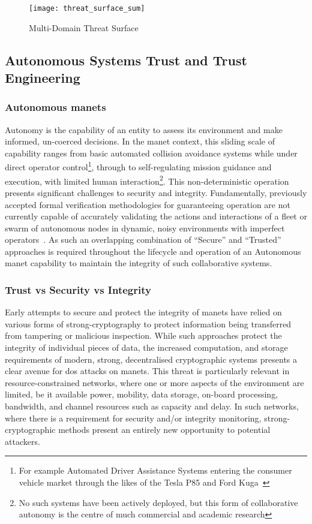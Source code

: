 \begin{figure}[h!]
	\centering
	\texttt{[image: threat\_surface\_sum]}
	\caption[Multi-Domain Threat Surface]{Multi-Domain Threat Surface}
	\label{fig:threat_surface}
\end{figure}


\subsection{Autonomous Systems Trust and Trust Engineering}

\subsubsection{Autonomous \glspl{manet}}
Autonomy is the capability of an entity to assess its environment and make informed, un-coerced decisions.
In the \gls{manet} context, this sliding scale of capability ranges from basic automated collision avoidance systems while under direct operator control\footnote{For example Automated Driver Assistance Systems entering the consumer vehicle market through the likes of the Tesla P85 and Ford Kuga~\cite{Sawade2016}}, through to self-regulating mission guidance and execution, with limited human interaction\footnote{No such systems have been actively deployed, but this form of collaborative autonomy is the centre of much commercial and academic research\cite{Rajesh2015,Autefage2015,Teke2015}}.
This non-deterministic operation presents significant challenges to security and integrity.
Fundamentally, previously accepted formal verification methodologies for guaranteeing operation are not currently capable of accurately validating the actions and interactions of a fleet or swarm of autonomous nodes in dynamic, noisy environments with imperfect operators~\cite{Teke2015}. 
As such an overlapping combination of ``Secure'' and ``Trusted'' approaches is required throughout the lifecycle and operation of an Autonomous \gls{manet} capability to maintain the integrity of such collaborative systems.

\subsubsection{Trust vs Security vs Integrity}

Early attempts to secure and protect the integrity of \glspl{manet} have relied on various forms of strong-cryptography to protect information being transferred from tampering or malicious inspection.
While such approaches protect the integrity of individual pieces of data, the increased computation, and storage requirements of modern, strong, decentralised cryptographic systems presents a clear avenue for \gls{dos} attacks on \glspl{manet}.
This threat is particularly relevant in resource-constrained networks, where one or more aspects of the environment are limited, be it available power, mobility, data storage, on-board processing, bandwidth, and channel resources such as capacity and delay.
In such networks, where there is a requirement for security and/or integrity monitoring, strong-cryptographic methods present an entirely new opportunity to potential attackers.

